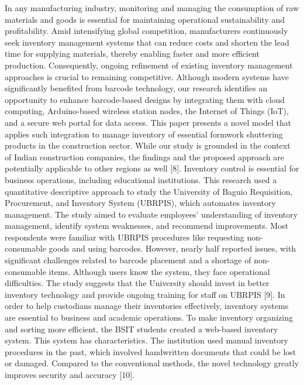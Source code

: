 \documentclass[12pt, letterpaper]{article}
\begin{document}
\hspace*{2em}In any manufacturing industry, monitoring and managing the consumption of raw materials and goods is essential for maintaining operational sustainability and profitability. Amid intensifying global competition, manufacturers continuously seek inventory management systems that can reduce costs and shorten the lead time for supplying materials, thereby enabling faster and more efficient production. Consequently, ongoing refinement of existing inventory management approaches is crucial to remaining competitive. Although modern systems have significantly benefited from barcode technology, our research identifies an opportunity to enhance barcode-based designs by integrating them with cloud computing, Arduino-based wireless station nodes, the Internet of Things (IoT), and a secure web portal for data access. This paper presents a novel model that applies such integration to manage inventory of essential formwork shuttering products in the construction sector. While our study is grounded in the context of Indian construction companies, the findings and the proposed approach are potentially applicable to other regions as well [8].
\hspace*{2em}Inventory control is essential for business operations, including educational institutions. This research used a quantitative descriptive approach to study the University of Baguio Requisition, Procurement, and Inventory System (UBRPIS), which automates inventory management. The study aimed to evaluate employees’ understanding of inventory management, identify system weaknesses, and recommend improvements. Most respondents were familiar with UBRPIS procedures like requesting non-consumable goods and using barcodes. However, nearly half reported issues, with significant challenges related to barcode placement and a shortage of non-consumable items. Although users know the system, they face operational difficulties. The study suggests that the University should invest in better inventory technology and provide ongoing training for staff on UBRPIS [9].
\hspace*{2em}In order to help custodians manage their inventories effectively, inventory systems are essential to business and academic operations. To make inventory organizing and sorting more efficient, the BSIT students created a web-based inventory system. This system has characteristics. The institution used manual inventory procedures in the past, which involved handwritten documents that could be lost or damaged. Compared to the conventional methods, the novel technology greatly improves security and accuracy [10].
\end{document}
